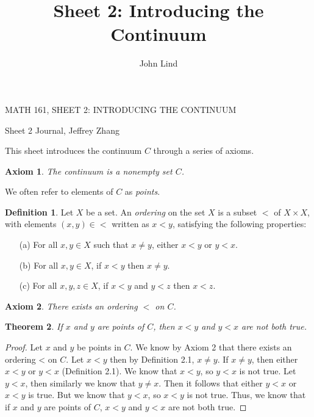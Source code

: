 \documentclass[12pt]{article}
\title{Sheet 2: Introducing the Continuum}
\author{John Lind}
\renewcommand{\_}[1]{\underline{ #1 }}
\newtheorem{theorem}{Theorem}[section]
\newtheorem{axiom}{Axiom}
\theoremstyle{definition}
\newtheorem{definition}[theorem]{Definition}
\numberwithin{equation}{subsection}
\begin{document}
\begin{center}
{\large MATH 161, SHEET 2: INTRODUCING THE CONTINUUM} \\ 
\vspace{.2in}  
\end{center}
Sheet 2 Journal, Jeffrey Zhang
\bigskip \bigskip

This sheet introduces the continuum $C$ through a series of axioms.

\setcounter{section}{2}   

\begin{axiom}  The continuum is a nonempty set $C$.  
\end{axiom}

We often refer to elements of $C$ as \emph{points}.


\begin{definition}  Let $X$ be a set.  An \emph{ordering} on the set $X$ is a subset $<$ of $X \times X$, with elements $(x, y) \in <$ written as $x < y$, satisfying the following properties:
\begin{itemize}
\item[(a)] For all $x, y \in X$ such that $x \neq y$, either $x < y$ or $y < x$.
\item[(b)] For all $x, y \in X$, if $x < y$ then $x \neq y$.
\item[(c)] For all $x, y, z \in X$, if $x < y$ and $y < z$ then $x < z$.
\end{itemize}
\end{definition}

\begin{axiom}  There exists an ordering $<$ on $C$.
\end{axiom}

\begin{theorem}  If $x$ and $y$ are points of $C$, then $x < y$ and $y < x$ are not both true.
\end{theorem}

\begin{proof}
Let $x$ and $y$ be points in $C$. We know by Axiom 2 that there exists an ordering < on $C$. Let $x < y$ then by Definition 2.1, $x \not = y$. If $x \not = y$, then either $x < y$ or $y < x$ (Definition 2.1). We know that $x < y$, so $y < x$ is not true. Let $y < x$, then similarly we know that $y \not = x$. Then it follows that either $y < x$ or $x < y$ is true. But we know that $y < x$, so $x < y$ is not true. Thus, we know that if $x$ and $y$ are points of $C$, $x < y$ and $y < x$ are not both true.
\end{proof}
\end{document}
